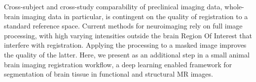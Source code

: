 Cross-subject and cross-study comparability of preclinical imaging data, whole-brain imaging 
data in particular, is contingent on the quality of registration to a standard reference space.
Current methods for neuroimaging rely on full image processing, with high varying intensities outside the brain Region Of Interest that interfere with registration.
Applying the processing to a masked image improves the quality of the latter.
Here, we present as an additional step in a small animal brain imaging registration workflow, a deep learning enabled framework for segmentation of brain tissue in functional and structural MR images.



